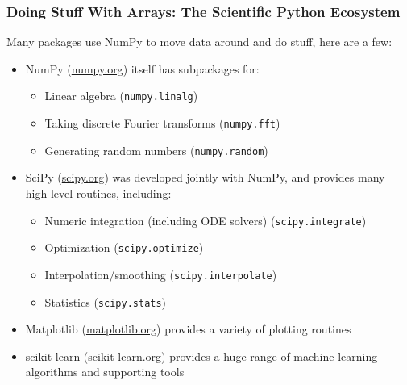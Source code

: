 \documentclass[xcolor={x11names,table}]{beamer}
\begin{document}
\begin{frame}
	\frametitle{Doing Stuff With Arrays: The Scientific Python Ecosystem}
	Many packages use NumPy to move data around and do stuff, here are a few:
	\begin{itemize}
		\item NumPy (\url{numpy.org}) itself has subpackages for:
		\begin{itemize}
			\item Linear algebra (\texttt{numpy.linalg})
			\item Taking discrete Fourier transforms (\texttt{numpy.fft})
			\item Generating random numbers (\texttt{numpy.random})
		\end{itemize}
		\item SciPy (\url{scipy.org}) was developed jointly with NumPy, and provides many high-level routines, including:
		\begin{itemize}
			\item Numeric integration (including ODE solvers) (\texttt{scipy.integrate})
			\item Optimization (\texttt{scipy.optimize})
			\item Interpolation/smoothing (\texttt{scipy.interpolate})
			\item Statistics (\texttt{scipy.stats})
		\end{itemize}
		\item Matplotlib (\url{matplotlib.org}) provides a variety of plotting routines
		\item scikit-learn (\url{scikit-learn.org}) provides a huge range of machine learning algorithms and supporting tools
	\end{itemize}
\end{frame}
\end{document}
